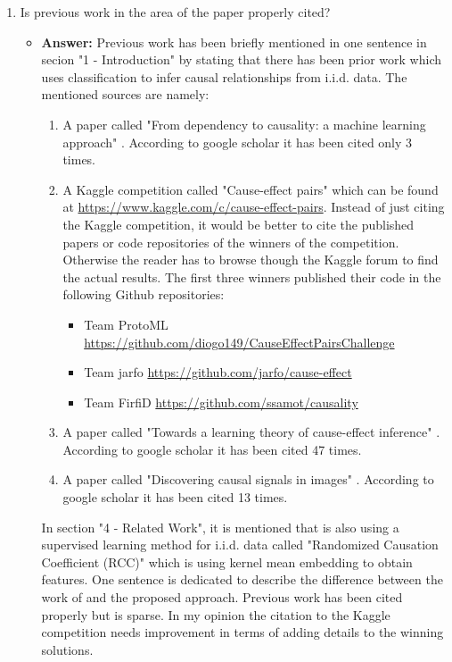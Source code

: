 \documentclass[a4paper]{article}
\begin{document}
\begin{enumerate}[label=(\alph*)]
	\item Is previous work in the area of the paper properly cited?
		\begin{itemize}
			\item \textbf{Answer:} Previous work has been briefly mentioned in one sentence in secion "1 - Introduction" by stating that there has been prior work which uses classification to infer causal relationships from i.i.d. data. The mentioned sources are namely:
			
			\begin{enumerate}[label=\Roman*]
				\item A paper called "From dependency to causality: a machine learning approach"  \cite{bontempi2015dependency}. According to google scholar it has been cited only 3 times.
				\item A Kaggle competition called "Cause-effect pairs" which can be found at \url{https://www.kaggle.com/c/cause-effect-pairs}. Instead of just citing the Kaggle competition, it would be better to cite the published papers or code repositories of the winners of the competition. Otherwise the reader has to browse though the Kaggle forum to find the actual results. The first three winners published their code in the following Github repositories:
				\begin{itemize}
					\item Team ProtoML \url{https://github.com/diogo149/CauseEffectPairsChallenge}
					\item Team jarfo \url{https://github.com/jarfo/cause-effect}
					\item Team FirfiD \url{https://github.com/ssamot/causality}
				\end{itemize}
				
								\item A paper called "Towards a learning theory of cause-effect inference" \cite{lopez2015towards}. According to google scholar it has been cited 47 times.
				\item A paper called "Discovering causal signals in images" \cite{lopez2017discovering}. According to google scholar it has been cited 13 times.
			\end{enumerate}
			
			In section "4 - Related Work", it is mentioned that \cite{lopez2015towards} is also using a supervised learning method for i.i.d. data called "Randomized Causation Coefficient (RCC)" which is using kernel mean embedding to obtain features. One sentence is dedicated to describe the difference between the work of \cite{lopez2015towards} and the proposed approach. Previous work has been cited properly but is sparse. In my opinion the citation to the Kaggle competition needs improvement in terms of adding details to the winning solutions.
			
		\end{itemize}		
\end{enumerate}
\end{document}
